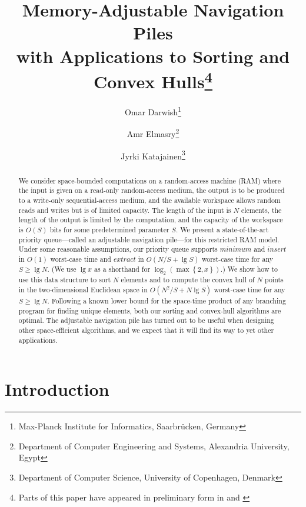 \documentclass[final,onetabnum,onefignum,onethmnum]{siamltex}
\newcommand{\Minimum}{\mbox{$\mathit{minimum}$}}
\newcommand{\Insert}{\mbox{$\mathit{insert}$}}
\newcommand{\Extract}{\mbox{$\mathit{extract}$}}
\newcommand{\set}[1]{\left\{#1\right\}}
\begin{document}
\title{Memory-Adjustable Navigation Piles\\{}with Applications to
  Sorting and Convex Hulls\thanks{Parts of this paper have appeared
  in preliminary form in \cite{AEK13} and \cite{DE14}}}

\author{Omar Darwish\thanks{Max-Planck Institute for Informatics, Saarbr\"{u}cken, Germany}
\and
Amr Elmasry\thanks{Department of Computer Engineering and Systems, Alexandria University, Egypt}
\and 
Jyrki Katajainen\thanks{Department of Computer Science, University of Copenhagen, Denmark}
}
 
\maketitle
\pagestyle{plain}

\begin{abstract} 
We consider space-bounded computations on a random-access machine (RAM)
where the input is given on a read-only random-access medium, the
output is to be produced to a write-only sequential-access medium, and
the available workspace allows random reads and writes but is of
limited capacity.  The length of the input is $N$ elements, the length
of the output is limited by the computation, and the capacity of the
workspace is $O(S)$ bits for some predetermined parameter $S$.
We present a state-of-the-art priority queue---called an adjustable
navigation pile---for this restricted RAM model.  Under some
reasonable assumptions, our priority queue supports \Minimum{} and
\Insert{} in $O(1)$ worst-case time and \Extract{} in $O(N/S + \lg{}
S)$ worst-case time for any $S \geq \lg{} N$. (We use $\lg{} x$ as a
shorthand for $\log_2(\max\set{2, x})$.)
We show how to use this data structure to sort $N$ elements and to
compute the convex hull of $N$ points in the two-dimensional Euclidean
space in $O(N^2/S + N \lg{} S)$ worst-case time for any $S \geq \lg{} N$. 
Following a known lower bound for the space-time product of any branching program for finding unique elements, 
both our sorting and convex-hull algorithms are optimal.
The adjustable navigation pile has turned out to be useful when
designing other space-efficient algorithms, and we expect that it will find
its way to yet other applications.
\end{abstract}

\section{Introduction}
\label{sec:introduction}
\end{document}
